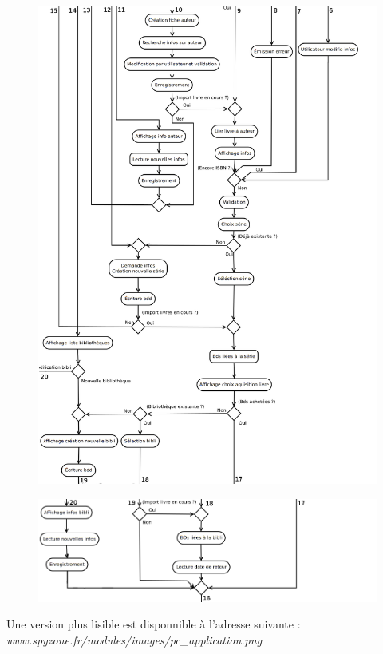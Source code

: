 \begin{figure}[h!]
\begin{center}
\includegraphics[width=16cm]{uml/appli_pc/p3.png}
\end{center}
\end{figure}
\newpage{}

\begin{figure}[t!]
\begin{center}
\includegraphics[width=16cm]{uml/appli_pc/p4.png}
\end{center}
\end{figure}

Une version plus lisible est disponnible à l'adresse suivante : 
\emph{www.spyzone.fr/modules/images/pc\_application.png}

